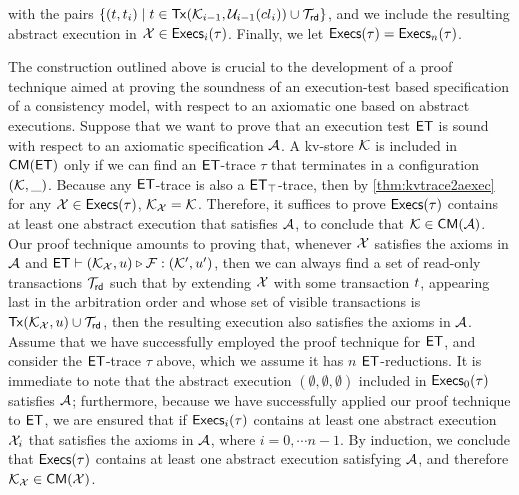 with the pairs $\{(t, t_{i}) \mid  t \in \mathsf{Tx}(\mathcal{K}_{i-1}, \mathcal{U}_{i-1}({cl}_{i})) \cup \mathcal{T}_{\mathsf{rd}}\}$, 
and we include the resulting abstract execution in $\mathcal{X} \in \mathsf{Execs}_{i}(\tau)$. Finally, we 
let $\mathsf{Execs}(\tau) = \mathsf{Execs}_{n}(\tau)$.
%

The construction outlined above is crucial to the development of a proof technique aimed 
at proving the soundness of an execution-test based specification of a consistency 
model, with respect to an axiomatic one based on abstract executions. 
Suppose that we want to prove that an execution test $\mathsf{ET}$ is sound with respect 
to an axiomatic specification $\mathcal{A}$. A kv-store $\mathcal{K}$ is included in $\mathsf{CM}(\mathsf{ET})$ only 
if we can find an $\mathsf{ET}$-trace $\tau$ that terminates in a configuration $(\mathcal{K}, \_)$. Because 
any $\mathsf{ET}$-trace is also a $\mathsf{ET}_{\top}$-trace, then by \cref{thm:kvtrace2aexec} 
for any $\mathcal{X} \in \mathsf{Execs}(\tau)$, $\mathcal{K}_{\mathcal{X}} = \mathcal{K}$. Therefore, it suffices to prove 
$\mathsf{Execs}(\tau)$ contains at least one abstract execution that satisfies $\mathcal{A}$, to conclude 
that $\mathcal{K} \in \mathsf{CM}(\mathcal{A})$. 
Our proof technique amounts to proving that, whenever $\mathcal{X}$ satisfies the axioms in
$\mathcal{A}$ and $\mathsf{ET} \vdash (\mathcal{K}_{\mathcal{X}}, u) \triangleright 
\mathcal{F}: (\mathcal{K}', u')$, then we can always find a set of read-only transactions $\mathcal{T}_{\mathsf{rd}}$ such that 
by extending $\mathcal{X}$ with some transaction $t$, appearing last in the arbitration order 
and whose set of visible transactions is $\mathsf{Tx}(\mathcal{K}_{\mathcal{X}}, u) \cup \mathcal{T}_{\mathsf{rd}}$, then 
the resulting execution also satisfies the axioms in $\mathcal{A}$. Assume that we have successfully employed the 
proof technique for $\mathsf{ET}$, and consider the $\mathsf{ET}$-trace $\tau$ above, which we assume it has 
$n$ $\mathsf{ET}$-reductions. It is immediate to note that the abstract execution $(\emptyset, \emptyset, \emptyset)$ 
included in $\mathsf{Execs}_{0}(\tau)$ satisfies $\mathcal{A}$; furthermore, because we have successfully applied our proof technique to $\mathsf{ET}$, 
we are ensured that if $\mathsf{Execs}_{i}(\tau)$ contains at least one abstract execution $\mathcal{X}_{i}$ that satisfies the axioms in $\mathcal{A}$, where $i=0,\cdots n-1$. 
By induction, we conclude that $\mathsf{Execs}(\tau)$ contains at least one abstract execution satisfying $\mathcal{A}$, and 
therefore $\mathcal{K}_{\mathcal{X}} \in \mathsf{CM}(\mathcal{X})$. 

